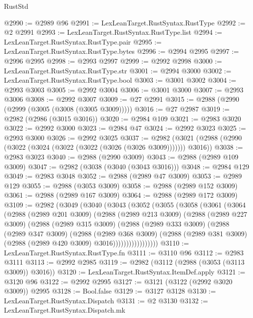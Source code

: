 \begin{lexlean}{RustStd}
\begin{coremodule}
@2990 := @2989 @96
@2991 := LexLeanTarget.RustSyntax.RustType
@2992 := @2 @2991
@2993 := LexLeanTarget.RustSyntax.RustType.list
@2994 := LexLeanTarget.RustSyntax.RustType.pair
@2995 := LexLeanTarget.RustSyntax.RustType.bytes
@2996 := @2994 @2995
@2997 := @2996 @2995
@2998 := @2993 @2997
@2999 := @2992 @2998
@3000 := LexLeanTarget.RustSyntax.RustType.str
@3001 := @2994 @3000
@3002 := LexLeanTarget.RustSyntax.RustType.bool
@3003 := @3001 @3002
@3004 := @2993 @3003
@3005 := @2992 @3004
@3006 := @3001 @3000
@3007 := @2993 @3006
@3008 := @2992 @3007
@3009 := @27 @2991
@3015 := @2988 (@2990 (@2999 (@3005 (@3008 (@3005 @3009)))))
@3016 := @27 @2987
@3019 := @2982 (@2986 (@3015 @3016))
@3020 := @2984 @109
@3021 := @2983 @3020
@3022 := @2992 @3000
@3023 := @2984 @47
@3024 := @2992 @3023
@3025 := @2993 @3000
@3026 := @2992 @3025
@3037 := @2982 (@3021 (@2988 (@2990 (@3022 (@3024 (@3022 (@3022 (@3026 (@3026 @3009))))))) @3016))
@3038 := @2983 @3023
@3040 := @2988 (@2990 @3009)
@3043 := @2988 (@2989 @109 @3009)
@3047 := @2982 (@3038 (@3040 (@3043 @3016)))
@3048 := @2984 @129
@3049 := @2983 @3048
@3052 := @2988 (@2989 @47 @3009)
@3053 := @2989 @129
@3055 := @2988 (@3053 @3009)
@3058 := @2988 (@2989 @152 @3009)
@3061 := @2988 (@2989 @167 @3009)
@3064 := @2988 (@2989 @172 @3009)
@3109 := @2982
    (@3049
      (@3040
        (@3043
          (@3052
            (@3055
              (@3058
                (@3061
                  (@3064
                    (@2988
                      (@2989 @201 @3009)
                      (@2988
                        (@2989 @213 @3009)
                        (@2988
                          (@2989 @227 @3009)
                          (@2988
                            (@2989 @315 @3009)
                            (@2988
                              (@2989 @333 @3009)
                              (@2988
                                (@2989 @347 @3009)
                                (@2988
                                  (@2989 @368 @3009)
                                  (@2988
                                    (@2989 @381 @3009)
                                    (@2988 (@2989 @420 @3009) @3016)))))))))))))))))
@3110 := LexLeanTarget.RustSyntax.RustType.fn
@3111 := @3110 @96
@3112 := @2983 @3111
@3113 := @2992 @2985
@3119 := @2982 (@3112 (@2988 (@3053 (@3113 @3009)) @3016))
@3120 := LexLeanTarget.RustSyntax.ItemDef.apply
@3121 := @3120 @96
@3122 := @2992 @2995
@3127 := @3121 (@3122 (@2992 @3020 @3009)) @2995
@3128 := Bool.false
@3129 := @3127 @3128
@3130 := LexLeanTarget.RustSyntax.Dispatch
@3131 := @2 @3130
@3132 := LexLeanTarget.RustSyntax.Dispatch.mk

\end{coremodule}
\end{lexlean}
